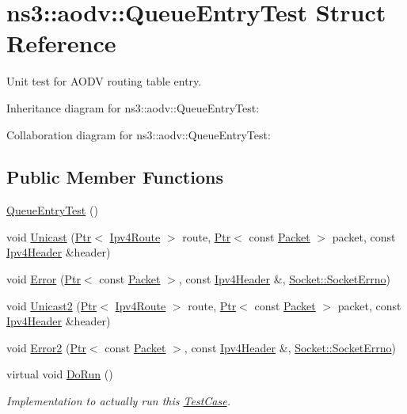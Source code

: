\hypertarget{structns3_1_1aodv_1_1QueueEntryTest}{}\section{ns3\+:\+:aodv\+:\+:Queue\+Entry\+Test Struct Reference}
\label{structns3_1_1aodv_1_1QueueEntryTest}


Unit test for A\+O\+DV routing table entry.  




Inheritance diagram for ns3\+:\+:aodv\+:\+:Queue\+Entry\+Test\+:


Collaboration diagram for ns3\+:\+:aodv\+:\+:Queue\+Entry\+Test\+:
\subsection*{Public Member Functions}
\begin{DoxyCompactItemize}
\item 
\hyperlink{structns3_1_1aodv_1_1QueueEntryTest_a8ade5617bba0b81cfdd003878c835eac}{Queue\+Entry\+Test} ()
\item 
void \hyperlink{structns3_1_1aodv_1_1QueueEntryTest_aa3f211d715837814ab8e3692bc5cadf2}{Unicast} (\hyperlink{classns3_1_1Ptr}{Ptr}$<$ \hyperlink{classns3_1_1Ipv4Route}{Ipv4\+Route} $>$ route, \hyperlink{classns3_1_1Ptr}{Ptr}$<$ const \hyperlink{classns3_1_1Packet}{Packet} $>$ packet, const \hyperlink{classns3_1_1Ipv4Header}{Ipv4\+Header} \&header)
\item 
void \hyperlink{structns3_1_1aodv_1_1QueueEntryTest_a9aff7c2983d235c565c722fd3dcc24ff}{Error} (\hyperlink{classns3_1_1Ptr}{Ptr}$<$ const \hyperlink{classns3_1_1Packet}{Packet} $>$, const \hyperlink{classns3_1_1Ipv4Header}{Ipv4\+Header} \&, \hyperlink{classns3_1_1Socket_ada1328c5ae0c28cb2a982caf8f6d6cca}{Socket\+::\+Socket\+Errno})
\item 
void \hyperlink{structns3_1_1aodv_1_1QueueEntryTest_a3dd406dc8d09fda9d8ba99ac20242cd9}{Unicast2} (\hyperlink{classns3_1_1Ptr}{Ptr}$<$ \hyperlink{classns3_1_1Ipv4Route}{Ipv4\+Route} $>$ route, \hyperlink{classns3_1_1Ptr}{Ptr}$<$ const \hyperlink{classns3_1_1Packet}{Packet} $>$ packet, const \hyperlink{classns3_1_1Ipv4Header}{Ipv4\+Header} \&header)
\item 
void \hyperlink{structns3_1_1aodv_1_1QueueEntryTest_ac2f6a7eb4dfba2b865aed983a401b4df}{Error2} (\hyperlink{classns3_1_1Ptr}{Ptr}$<$ const \hyperlink{classns3_1_1Packet}{Packet} $>$, const \hyperlink{classns3_1_1Ipv4Header}{Ipv4\+Header} \&, \hyperlink{classns3_1_1Socket_ada1328c5ae0c28cb2a982caf8f6d6cca}{Socket\+::\+Socket\+Errno})
\item 
virtual void \hyperlink{structns3_1_1aodv_1_1QueueEntryTest_a55f122b89ef32138c7322933ebac3a0b}{Do\+Run} ()
\begin{DoxyCompactList}\small\item\em Implementation to actually run this \hyperlink{classns3_1_1TestCase}{Test\+Case}. \end{DoxyCompactList}\end{DoxyCompactItemize}
